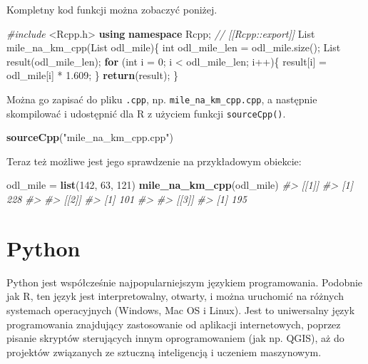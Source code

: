 \documentclass[paper=6in:9in,pagesize=pdftex,headinclude=on,footinclude=on,10pt]{scrbook}
\newenvironment{Shaded}{\begin{snugshade}}{\end{snugshade}}
\newcommand{\CommentTok}[1]{\textcolor[rgb]{0.56,0.35,0.01}{\textit{#1}}}
\newcommand{\ControlFlowTok}[1]{\textcolor[rgb]{0.13,0.29,0.53}{\textbf{#1}}}
\newcommand{\DataTypeTok}[1]{\textcolor[rgb]{0.13,0.29,0.53}{#1}}
\newcommand{\DecValTok}[1]{\textcolor[rgb]{0.00,0.00,0.81}{#1}}
\newcommand{\FloatTok}[1]{\textcolor[rgb]{0.00,0.00,0.81}{#1}}
\newcommand{\ImportTok}[1]{#1}
\newcommand{\KeywordTok}[1]{\textcolor[rgb]{0.13,0.29,0.53}{\textbf{#1}}}
\newcommand{\NormalTok}[1]{#1}
\newcommand{\PreprocessorTok}[1]{\textcolor[rgb]{0.56,0.35,0.01}{\textit{#1}}}
\newcommand{\StringTok}[1]{\textcolor[rgb]{0.31,0.60,0.02}{#1}}
\begin{document}
Kompletny kod funkcji można zobaczyć poniżej.

\begin{Shaded}
\begin{Highlighting}[]
\PreprocessorTok{#include }\ImportTok{<Rcpp.h>}
\KeywordTok{using} \KeywordTok{namespace}\NormalTok{ Rcpp;}
\CommentTok{// [[Rcpp::export]]}
\NormalTok{List mile_na_km_cpp(List odl_mile)\{}
  \DataTypeTok{int}\NormalTok{ odl_mile_len = odl_mile.size();}
\NormalTok{  List result(odl_mile_len);}
  \ControlFlowTok{for}\NormalTok{ (}\DataTypeTok{int}\NormalTok{ i = }\DecValTok{0}\NormalTok{; i < odl_mile_len; i++)\{}
\NormalTok{    result[i] = odl_mile[i] * }\FloatTok{1.609}\NormalTok{;}
\NormalTok{  \}}
  \ControlFlowTok{return}\NormalTok{(result);}
\NormalTok{\}}
\end{Highlighting}
\end{Shaded}

Można go zapisać do pliku \texttt{.cpp}, np. \texttt{mile\_na\_km\_cpp.cpp}, a następnie skompilować i udostępnić dla R z użyciem funkcji \texttt{sourceCpp()}.

\begin{Shaded}
\begin{Highlighting}[]
\KeywordTok{sourceCpp}\NormalTok{(}\StringTok{"mile_na_km_cpp.cpp"}\NormalTok{)}
\end{Highlighting}
\end{Shaded}

Teraz też możliwe jest jego sprawdzenie na przykładowym obiekcie:

\begin{Shaded}
\begin{Highlighting}[]
\NormalTok{odl_mile =}\StringTok{ }\KeywordTok{list}\NormalTok{(}\DecValTok{142}\NormalTok{, }\DecValTok{63}\NormalTok{, }\DecValTok{121}\NormalTok{)}
\KeywordTok{mile_na_km_cpp}\NormalTok{(odl_mile)}
\CommentTok{#> [[1]]}
\CommentTok{#> [1] 228}
\CommentTok{#> }
\CommentTok{#> [[2]]}
\CommentTok{#> [1] 101}
\CommentTok{#> }
\CommentTok{#> [[3]]}
\CommentTok{#> [1] 195}
\end{Highlighting}
\end{Shaded}

\hypertarget{python}{%
\section{Python}\label{python}}

Python jest współcześnie najpopularniejszym językiem programowania.
Podobnie jak R, ten język jest interpretowalny, otwarty, i można uruchomić na różnych systemach operacyjnych (Windows, Mac OS i Linux).
Jest to uniwersalny język programowania znajdujący zastosowanie od aplikacji internetowych, poprzez pisanie skryptów sterujących innym oprogramowaniem (jak np. QGIS), aż do projektów związanych ze sztuczną inteligencją i uczeniem maszynowym.
\end{document}
